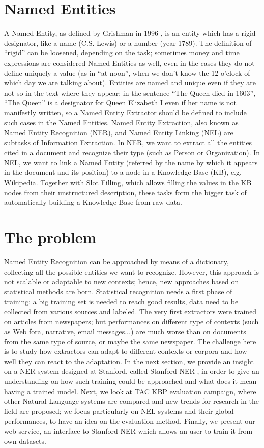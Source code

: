 \documentclass[a4paper,11pt]{report}
\begin{document}
\section{Named Entities}
A Named Entity, as defined by Grishman in 1996 \cite{grishman1996}, is an entity which has a rigid designator, like a name (C.S. Lewis) or a number (year 1789). The definition of ``rigid'' can be loosened, depending on the task; sometimes money and time expressions are considered Named Entities as well, even in the cases they do not define uniquely a value (as in ``at noon'', when we don't know the 12 o'clock of which day we are talking about). Entities are named and unique even if they are not so in the text where they appear: in the sentence ``The Queen died in 1603'', ``The Queen'' is a designator for Queen Elizabeth I even if her name is not manifestly written, so a Named Entity Extractor should be defined to include such cases in the Named Entities.
Named Entity Extraction, also known as Named Entity Recognition (NER), and Named Entity Linking (NEL) are subtasks of Information Extraction. In NER, we want to extract all the entities cited in a document and recognize their type (such as Person or Organization). In NEL, we want to link a Named Entity (referred by the name by which it appears in the document and its position) to a node in a Knowledge Base (KB), e.g. Wikipedia. Together with Slot Filling, which allows filling the values in the KB nodes from their unstructured description, these tasks form the bigger task of automatically building a Knowledge Base from raw data.
\section{The problem}
Named Entity Recognition can be approached by means of a dictionary, collecting all the possible entities we want to recognize. However, this approach is not scalable or adaptable to new contexts; hence, new approaches based on statistical methods are born. Statistical recognition needs a first phase of training: a big training set is needed to reach good results, data need to be collected from various sources and labeled. The very first extractors were trained on articles from newspapers; but performances on different type of contexts (such as Web fora, narrative, email messages...) are much worse than on documents from the same type of source, or maybe the same newspaper.
The challenge here is to study how extractors can adapt to different contexts or corpora and how well they can react to the adaptation. In the next section, we provide an insight on a NER system designed at Stanford, called Stanford NER \cite{finkel2005incorporating}, in order to give an understanding on how such training could be approached and what does it mean having a trained model. Next, we look at TAC KBP evaluation campaign, where other Natural Language systems are compared and new trends for research in the field are proposed; we focus particularly on NEL systems and their global performances, to have an idea on the evaluation method. Finally, we present our web service, an interface to Stanford NER which allows an user to train it from own datasets.
\end{document}
